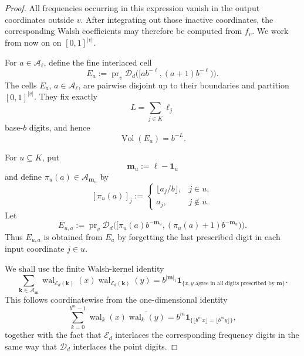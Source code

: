 \documentclass[10pt,a4paper]{amsart}
\newcommand{\D}{\mathcal D}
\newcommand{\E}{\mathcal E}
\newcommand{\Vol}{\operatorname{Vol}}
\newcommand{\wal}{\operatorname{wal}}
\begin{document}
\begin{proof}
All frequencies occurring in this expression vanish in the output
coordinates outside $v$.  After integrating out those inactive
coordinates, the corresponding Walsh coefficients may therefore be
computed from $f_v$.  We work from now on on
$[0,1]^{|v|}$.

For $a\in\mathcal A_{\boldsymbol\ell}$, define the fine interlaced
cell
\[
 E_a
 :=
 \operatorname{pr}_v
 \D_d\bigl(
 [ab^{-\boldsymbol\ell},
  (a+1)b^{-\boldsymbol\ell})
 \bigr).
\]
The cells $E_a$, $a\in\mathcal A_{\boldsymbol\ell}$, are pairwise
disjoint up to their boundaries and partition $[0,1]^{|v|}$.  They
fix exactly
\[
 L=\sum_{j\in K}\ell_j
\]
base-$b$ digits, and hence
\begin{equation}\label{eq:Ea-volume-detailed}
 \Vol(E_a)=b^{-L}.
\end{equation}

For $u\subseteq K$, put
\[
 \boldsymbol m_u:=\boldsymbol\ell-\boldsymbol1_u
\]
and define $\pi_u(a)\in\mathcal A_{\boldsymbol m_u}$ by
\[
 [\pi_u(a)]_j
 :=
 \begin{cases}
  \lfloor a_j/b\rfloor, & j\in u,\\
  a_j, & j\notin u.
 \end{cases}
\]
Let
\[
 E_{u,a}
 :=
 \operatorname{pr}_v
 \D_d\bigl(
 [\pi_u(a)b^{-\boldsymbol m_u},
  (\pi_u(a)+1)b^{-\boldsymbol m_u})
 \bigr).
\]
Thus $E_{u,a}$ is obtained from $E_a$ by forgetting the last
prescribed digit in each input coordinate $j\in u$.

We shall use the finite Walsh-kernel identity
\begin{equation}\label{eq:finite-walsh-kernel-detailed}
 \sum_{\boldsymbol k\in\mathcal A_{\boldsymbol m}}
 \wal_{\E_d(\boldsymbol k)}(x)
 \overline{\wal_{\E_d(\boldsymbol k)}(y)}
 =
 b^{|\boldsymbol m|_1}
 \mathbf1_{\{x,y\text{ agree in all digits prescribed by }
                  \boldsymbol m\}}.
\end{equation}
This follows coordinatewise from the one-dimensional identity
\[
 \sum_{k=0}^{b^m-1}
 \wal_k(x)\overline{\wal_k(y)}
 =
 b^m
 \mathbf1_{\{\lfloor b^m x\rfloor=\lfloor b^m y\rfloor\}},
\]
together with the fact that $\E_d$ interlaces the corresponding
frequency digits in the same way that $\D_d$ interlaces the point
digits.


\end{proof}
\end{document}
